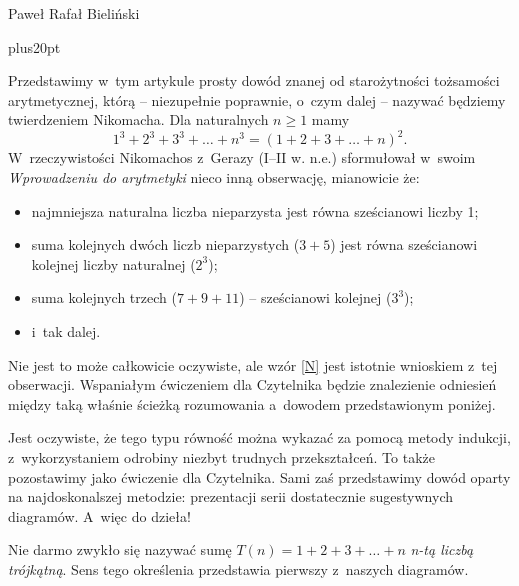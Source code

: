 

{Paweł Rafał Bieliński}

\maladelta

\vskip20pt plus20pt 


Przedstawimy w~tym artykule prosty dowód znanej od starożytności tożsamości arytmetycznej, którą -- niezupełnie poprawnie, o~czym dalej -- nazywać będziemy twierdzeniem Nikomacha. Dla naturalnych $n\geq 1$ mamy
\begin{equation*} 1^3+2^3+3^3+\ldots +n^3=(1+2+3+\ldots +n)^2. \label{N}\tag{N}
\end{equation*}
W~rzeczywistości Nikomachos z~Gerazy (I--II w. n.e.) sformułował w~swoim \emph{Wprowadzeniu do arytmetyki} nieco inną obserwację, mianowicie że:
\begin{itemize}
\item najmniejsza naturalna liczba nieparzysta jest równa sześcianowi liczby 1; 

\item suma kolejnych dwóch liczb nieparzystych ($3+5$) jest równa sześcianowi kolejnej liczby naturalnej ($2^3$);

\item suma kolejnych trzech ($7+9+11$) -- sześcianowi kolejnej ($3^3$);

\item i~tak dalej. 
\end{itemize}
Nie jest to może całkowicie oczywiste, ale wzór \eqref{N} jest istotnie wnioskiem z~tej obserwacji. Wspaniałym ćwiczeniem dla Czytelnika będzie znalezienie odniesień między taką właśnie ścieżką rozumowania a~dowodem przedstawionym poniżej.

Jest oczywiste, że tego typu równość można wykazać za pomocą metody indukcji, z~wykorzystaniem odrobiny niezbyt trudnych przekształceń. To także pozostawimy jako ćwiczenie dla Czytelnika. Sami zaś przedstawimy dowód oparty na najdoskonalszej metodzie: prezentacji serii dostatecznie sugestywnych diagramów. A~więc do dzieła! 


Nie darmo zwykło się nazywać sumę $T(n)=1+2+3+\ldots +n$ \emph{n-tą liczbą trójkątną}. Sens tego określenia przedstawia pierwszy z~naszych diagramów.\vspace*{6pt}

